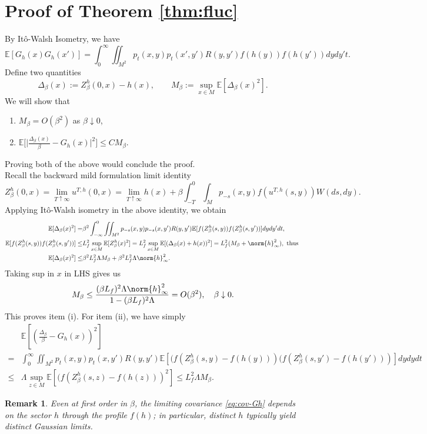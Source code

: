 \documentclass{article}
\newtheorem{remark}[theorem]{Remark}
\numberwithin{theorem}{section}
\def\text{\mbox}
\def\EE{\mathbb{E}} %
\begin{document}
\section{Proof of Theorem \ref{thm:fluc}}\label{sec:fluc}

By It\^o-Walsh Isometry, we have \[\label{eq:cov-Gh}\EE[G_h(x)G_h(x')]=\int_0^\infty\iint_{M^2}p_t(x,y)p_t(x',y')R(y,y')f(h(y))f(h(y'))dydy't.\]
Define two quantities \[\Delta_\beta(x):=Z^h_\beta(0,x)-h(x),\qquad M_\beta:=\sup_{x\in M}\EE[\Delta_\beta(x)^2].\]
We will show that 
\begin{enumerate}
    \item[{\rm (i)}] $M_\beta=O(\beta^2)$ as $\beta\downarrow0$,
    \item[{\rm (ii)}] \(\EE\big[\big|\frac{\Delta_\beta(x)}{\beta}-G_h(x)\big|^2\big]\leq CM_\beta\).
\end{enumerate}
Proving both of the above would conclude the proof.\\
Recall the backward mild formulation limit identity \[Z^h_\beta(0,x)=\lim_{T\uparrow\infty}u^{T,h}(0,x)=\lim_{T\uparrow\infty}h(x)+\beta\int_{-T}^0\int_M p_{-s}(x,y)f(u^{T,h}(s,y)) W(ds,dy).\]
Applying It\^o-Walsh isometry in the above identity, we obtain \begin{align*}
    \EE[\Delta_\beta(x)^2]=&\beta^2\int_{-\infty}^0\iint_{M^2} p_{-s}(x,y)p_{-s}(x,y')R(y,y')\EE[f(Z^h_\beta(s,y))f(Z^h_\beta(s,y'))]dydy'dt,\\
    \EE[f(Z^h_\beta(s,y))f(Z^h_\beta(s,y'))]\leq&L_f^2\sup_{x\in M}\EE[Z^h_\beta(x)^2]=L_f^2\sup_{x\in M}\EE[(\Delta_\beta(x)+h(x))^2]=L_f^2(M_\beta+\norm{h}^2_\infty),\text{ thus }\\
    \EE[\Delta_\beta(x)^2]\leq&\beta^2 L_f^2\Lambda M_\beta+\beta^2 L_f^2\Lambda\norm{h}^2_\infty.
\end{align*}
Taking sup in $x$ in LHS gives us \[M_\beta\leq \frac{(\beta L_f)^2\Lambda \norm{h}^2_\infty}{1-(\beta L_f)^2\Lambda}=O(\beta^2),\quad \beta\downarrow0.\]
This proves item (i). For item (ii), we have simply \begin{align*}
    &\EE\left[\left(\frac{\Delta_\beta}{\beta}-G_h(x)\right)^2\right]\\
    =& \int_{0}^\infty\iint_{M^2}p_{t}(x,y)p_t(x,y')R(y,y')\EE[(f(Z^h_\beta(s,y)-f(h(y)))(f(Z^h_\beta(s,y')-f(h(y')))]dydydt\\
    \leq& \Lambda \sup_{z\in M}\EE[(f(Z^h_\beta(s,z)-f(h(z)))^2]\leq L_f^2\Lambda M_\beta.
\end{align*} 

\begin{remark}
Even at first order in $\beta$, the limiting covariance \eqref{eq:cov-Gh} depends on the sector $h$ through the profile $f(h)$; in particular, distinct $h$ typically yield distinct Gaussian limits.
\end{remark}
\end{document}
